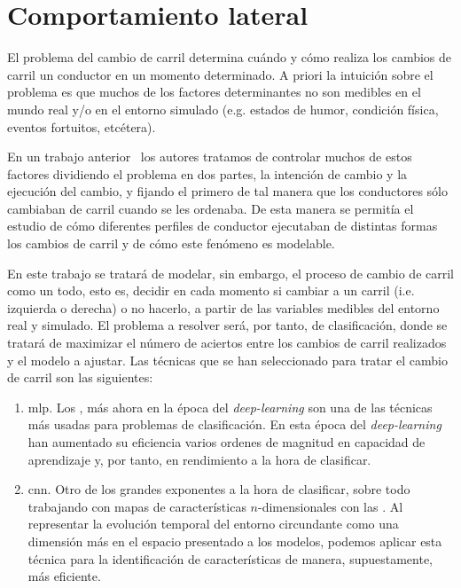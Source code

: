 \chapter{Comportamiento lateral}
\label{ch:lane-change-model}

El problema del cambio de carril determina cuándo y cómo realiza los cambios de carril un conductor en un momento determinado. A priori la intuición sobre el problema es que muchos de los factores determinantes no son medibles en el mundo real y/o en el entorno simulado (e.g. estados de humor, condición física, eventos fortuitos, etcétera).

En un trabajo anterior~\cite{diaz2018modelling} los autores tratamos de controlar muchos de estos factores dividiendo el problema en dos partes, la intención de cambio y la ejecución del cambio, y fijando el primero de tal manera que los conductores sólo cambiaban de carril cuando se les ordenaba. De esta manera se permitía el estudio de cómo diferentes perfiles de conductor ejecutaban de distintas formas los cambios de carril y de cómo este fenómeno es modelable.

En este trabajo se tratará de modelar, sin embargo, el proceso de cambio de carril como un todo, esto es, decidir en cada momento si cambiar a un carril (i.e. izquierda o derecha) o no hacerlo, a partir de las variables medibles del entorno real y simulado. El problema a resolver será, por tanto, de clasificación, donde se tratará de maximizar el número de aciertos entre los cambios de carril realizados y el modelo a ajustar. Las técnicas que se han seleccionado para tratar el cambio de carril son las siguientes:

\begin{enumerate}
	\item \acrshort{mlp}. Los , más ahora en la época del \textit{deep-learning} son una de las técnicas más usadas para problemas de clasificación. En esta época del \textit{deep-learning} han aumentado su eficiencia varios ordenes de magnitud en capacidad de aprendizaje y, por tanto, en rendimiento a la hora de clasificar.
	\item \acrshort{cnn}. Otro de los grandes exponentes a la hora de clasificar, sobre todo trabajando con mapas de características $n$-dimensionales con las . Al representar la evolución temporal del entorno circundante como una dimensión más en el espacio presentado a los modelos, podemos aplicar esta técnica para la identificación de características de manera, supuestamente, más eficiente.
\end{enumerate}

